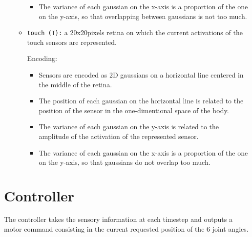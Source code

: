 \documentclass[11pt]{article}
\begin{document}
\begin{itemize}
\begin{itemize}
\begin{itemize}
                    \item The variance of each gaussian on the x-axis is a
                        proportion of the one on the y-axis, so that
                        overlapping between gaussians is not too much.

                \end{itemize} 

            \item \texttt{touch (T):} a 20x20pixels retina on which the current
                activations of the touch sensors are represented.

                Encoding:

                \begin{itemize} 

                    \item Sensors are encoded as 2D gaussians on a horizontal
                        line centered in the middle of the retina. 

                    \item The position of each gaussian on the horizontal line
                        is related to the position of the sensor in the
                        one-dimentional space of the body.

                    \item The variance of each gaussian on the y-axis is
                        related to the amplitude of the activation of the
                        represented sensor.

                    \item The variance of each gaussian on the x-axis is a
                        proportion of the one on the y-axis, so that gaussians
                        do not overlap too much.

                \end{itemize} 

        \end{itemize}

\end{itemize}



\section{Controller} The controller takes the sensory information at each
timestep and outputs a motor command consisting in the current requested
position of the 6 joint angles.
\end{document}
